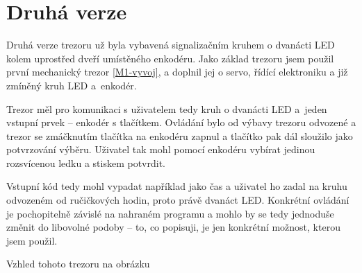 \section{Druhá verze}
\label{E2-vyvoj}
Druhá verze trezoru už byla vybavená signalizačním kruhem o dvanácti LED kolem uprostřed dveří
umístěného enkodéru. Jako základ trezoru jsem použil první mechanický trezor \ref{M1-vyvoj},
a doplnil jej o servo, řídící elektroniku a již zmíněný kruh LED a~enkodér.

Trezor měl pro komunikaci s uživatelem tedy kruh o dvanácti LED a~jeden vstupní prvek -- enkodér s tlačítkem.
Ovládání bylo od výbavy trezoru odvozené a trezor se zmáčknutím tlačítka na enkodéru zapnul a tlačítko pak dál sloužilo jako potvrzování výběru.
Uživatel tak mohl pomocí enkodéru vybírat jedinou rozsvícenou ledku a stiskem potvrdit. 

Vstupní kód tedy mohl vypadat 
například jako čas a uživatel ho zadal na kruhu odvozeném od ručičkových hodin, proto právě dvanáct LED.
Konkrétní ovládání je pochopitelně závislé na nahraném programu a mohlo by se tedy jednoduše změnit do libovolné podoby --
to, co popisuji, je jen konkrétní možnost, kterou jsem použil. 

Vzhled tohoto trezoru na obrázku 

\newpage